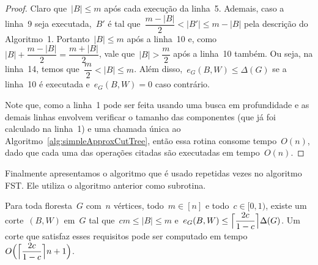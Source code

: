 	\begin{proof}
	Claro que~${|B|\le m}$ após cada execução da linha~5.
	Ademais, caso a linha~9 seja executada,~$B'$ é tal 
	que~${\dfrac{m-|B|}{2}< |B'|\le m-|B|}$
	pela descrição do Algoritmo~1.
	Portanto~${|B|\le m}$ após a linha~10 e, 
	como~${|B| + \dfrac{m-|B|}{2} = \dfrac{m+|B|}{2}}$, vale 
	que~${|B|>\dfrac{m}{2}}$ após a linha~10 também.
	Ou seja, na linha~14, temos que~${\dfrac{m}{2} < |B| \le m}$.
	Além disso,~${e_G(B,W)\le \Delta(G)}$ se a linha~10 é
	executada e~${e_G(B,W)=0}$ caso contrário.

	Note que, como a linha~1 pode ser feita usando uma busca em 
	profundidade e as demais linhas envolvem verificar o tamanho 
	das componentes (que já foi calculado na linha~1) e uma 
	chamada única ao Algoritmo~\ref{alg:simpleApproxCutTree}, então 
	essa rotina consome tempo~$O(n)$, dado que cada uma 
	das operações citadas são executadas em tempo~$O(n)$. 
\end{proof}

\bigskip
\bigskip
\bigskip



Finalmente apresentamos o algoritmo que é usado repetidas 
vezes no algoritmo FST.
Ele utiliza o algoritmo anterior como subrotina.

\begin{lem}
\label{lema:approxCutForest}
	Para toda floresta~$G$ com~$n$ vértices, todo~${m \in [n]}$ e 
	todo~${c \in [0,1)}$, existe um corte~$(B,W)$ em~$G$ tal 
	que~${cm \le |B| \le m}$ 
	e~${e_G(B,W) \le \ceil[\Big]{ \dfrac{2c}{1-c}} \Delta(G)}$.
	Um corte que satisfaz esses requisitos pode ser computado em
	tempo~${O\Big(\ceil[\Big]{ \dfrac{2c}{1-c}} n+1\Big)}$.
\end{lem}


